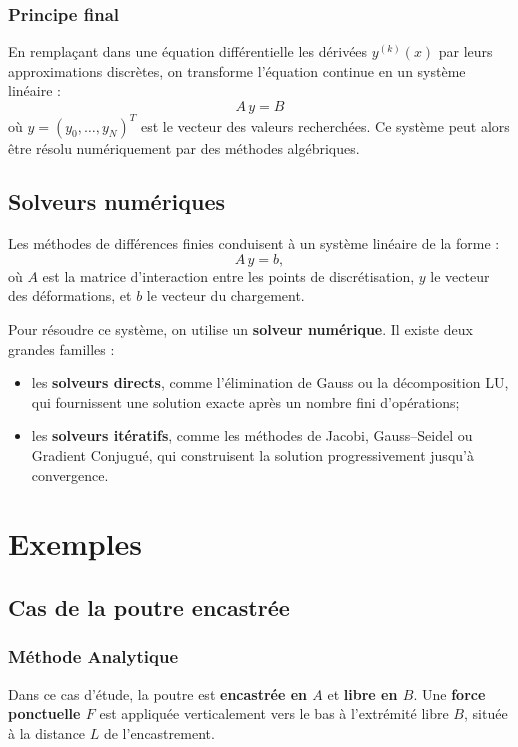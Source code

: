 \documentclass[12pt, a4paper]{article}
\begin{document}
\subsubsection{Principe final}
En remplaçant dans une équation différentielle les dérivées 
$y^{(k)}(x)$ par leurs approximations discrètes, 
on transforme l’équation continue en un système linéaire :
\[
A\,y = B
\]
où $y = (y_0,\dots,y_N)^T$ est le vecteur des valeurs recherchées.
Ce système peut alors être résolu numériquement par des méthodes algébriques.

\subsection{Solveurs numériques}

Les méthodes de différences finies conduisent à un système linéaire de la forme :
\[
A \, y = b,
\]
où $A$ est la matrice d'interaction entre les points de discrétisation, $y$ le vecteur des déformations, et $b$ le vecteur du chargement.

Pour résoudre ce système, on utilise un \textbf{solveur numérique}. Il existe deux grandes familles :
\begin{itemize}
\item les \textbf{solveurs directs}, comme l’élimination de Gauss ou la décomposition LU, qui fournissent une solution exacte après un nombre fini d’opérations;
  \item les \textbf{solveurs itératifs}, comme les méthodes de Jacobi, Gauss–Seidel ou Gradient Conjugué, qui construisent la solution progressivement jusqu’à convergence.
\end{itemize}

\section{Exemples}
\subsection{Cas de la poutre encastrée}

\subsubsection{Méthode Analytique}
Dans ce cas d'étude, la poutre est \textbf{encastrée en $A$} et \textbf{libre en $B$}. 
Une \textbf{force ponctuelle $F$} est appliquée verticalement vers le bas à l’extrémité libre $B$, située à la distance $L$ de l’encastrement. 
\end{document}

